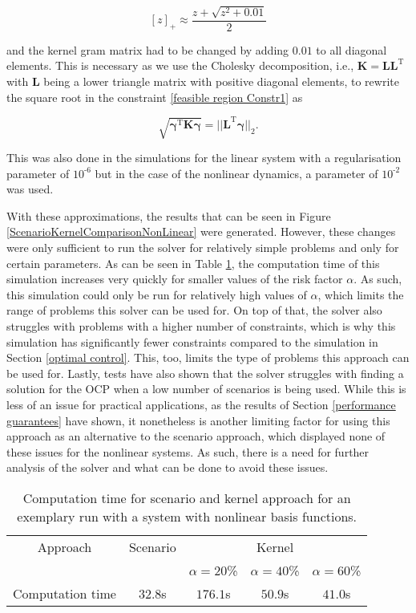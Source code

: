 \begin{equation} \label{max function}
[z]_+ \approx \frac{z + \sqrt{z^2 + 0.01}}{2}
\end{equation}

and the kernel gram matrix had to be changed by adding $0.01$ to all diagonal elements. This is necessary as we use the Cholesky decomposition, i.e., $\boldsymbol{K} = \boldsymbol{L} \boldsymbol{L}^\text{T}$ with $\boldsymbol{L}$ being a lower triangle matrix with positive diagonal elements, to rewrite the square root in the constraint \eqref{feasible region Constr1} as

\begin{equation} \label{square root}
\sqrt{\boldsymbol{\gamma}^\text{T}\boldsymbol{K}\boldsymbol{\gamma}} = ||\boldsymbol{L}^\text{T} \boldsymbol{\gamma}||_2.
\end{equation}

This was also done in the simulations for the linear system with a regularisation parameter of $10^{\text{-}6}$ but in the case of the nonlinear dynamics, a parameter of $10^{\text{-}2}$ was used.

With these approximations, the results that can be seen in Figure \ref{ScenarioKernelComparisonNonLinear} were generated. However, these changes were only sufficient to run the solver for relatively simple problems and only for certain parameters. As can be seen in Table \ref{tab:computation times}, the computation time of this simulation increases very quickly for smaller values of the risk factor $\alpha$. As such, this simulation could only be run for relatively high values of $\alpha$, which limits the range of problems this solver can be used for. On top of that, the solver also struggles with problems with a higher number of constraints, which is why this simulation has significantly fewer constraints compared to the simulation in Section \ref{optimal control}. This, too, limits the type of problems this approach can be used for. Lastly, tests have also shown that the solver struggles with finding a solution for the OCP when a low number of scenarios is being used. While this is less of an issue for practical applications, as the results of Section \ref{performance guarantees} have shown, it nonetheless is another limiting factor for using this approach as an alternative to the scenario approach, which displayed none of these issues for the nonlinear systems. As such, there is a need for further analysis of the solver and what can be done to avoid these issues.


\begin{table}
\centering
\begin{tabular}{|c| c| c| c| c|}
\hline
Approach & Scenario &  \multicolumn{3}{|c|}{Kernel}\\  \cline{3-5} & &  $\alpha = 20$\% & $\alpha = 40$\% & $\alpha = 60$\% \\
\hline
Computation time & $32.8$s & $176.1$s & $50.9$s & $41.0$s\\
\hline
\end{tabular}
\caption{Computation time for scenario and kernel approach for an exemplary run with a system with nonlinear basis functions.}
\label{tab:computation times}
\end{table} 
